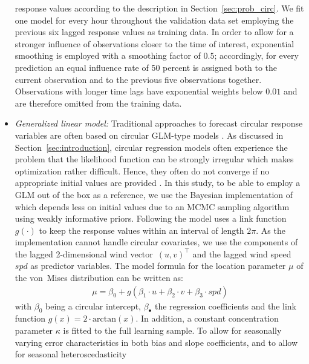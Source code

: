 \documentclass[nojss,shortnames]{jss}
\numberwithin{equation}{section}
\begin{document}
\begin{itemize}
    response values according to the description in Section~\ref{sec:prob_circ}.
    We fit one model for every hour throughout the validation data set employing
    the previous six lagged response values as training data. In order to allow for
    a stronger influence of observations closer to the time of interest,
    exponential smoothing is employed with a smoothing factor of $0.5$;
    accordingly, for every prediction an equal influence rate of 50 percent is
    assigned both to the current observation and to the previous five observations
    together. Observations with longer time lags have exponential weights below
    $0.01$ and are therefore omitted from the training data.
  \item \emph{Generalized linear model:}
    Traditional approaches to forecast circular response variables are often
    based on circular GLM-type models \citep{Fisher:1993}. As discussed in
    Section~\ref{sec:introduction}, circular regression models often experience the
    problem that the likelihood function can be strongly irregular which makes
    optimization rather difficult. Hence, they often do not converge if no
    appropriate initial values are provided \citep{Pewsey+Neuhaeuser+Ruxton:2013,
    Gill+Hangartner:2010}. In this study, to be able to employ a GLM out of the box
    as a reference, we use the Bayesian implementation of
    \cite{Mulder+Klugkist:2017} which depends less on initial values due to an MCMC
    sampling algorithm using weakly informative priors.  \newline Following
    \cite{Mulder+Klugkist:2017} the model uses a link function~$g(\cdot)$ to keep the
    response values within an interval of length $2\pi$. As the implementation
    cannot handle circular covariates, we use the components of the lagged
    2-dimensional wind vector~$(u, v)^{\top}$ and the lagged
    wind speed $spd$ as predictor variables. The model formula for the location
    parameter $\mu$ of the von~Mises distribution can be written as:
    \begin{align}
      \mu = \beta_0 + g(\beta_1 \cdot u + \beta_2 \cdot v + \beta_3 \cdot spd)
    \end{align}
    with $\beta_0$ being a circular intercept, $\beta_\bullet$ the regression
    coefficients and the link function $g(x) = 2 \cdot \text{arctan}(x)$. In
    addition, a constant concentration parameter $\kappa$ is fitted to the full
    learning sample. To allow for seasonally varying error characteristics in both
    bias and slope coefficients, and to allow for seasonal heteroscedasticity

\end{itemize}
\end{document}
